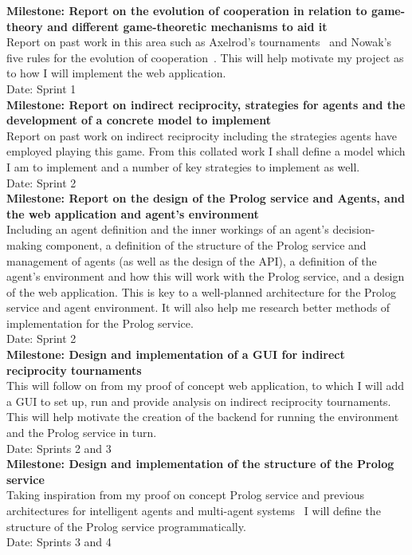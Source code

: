 \documentclass{article}
\begin{document}
\noindent\textbf{Milestone: Report on the evolution of cooperation in relation to game-theory and different game-theoretic mechanisms to aid it}\\
Report on past work in this area such as Axelrod's tournaments~\cite{evolution_of_cooperation} and Nowak's five rules for the evolution of cooperation~\cite{five_rules_coop}. This will help motivate my project as to how I will implement the web application.\\
Date: Sprint 1\\

\noindent\textbf{Milestone: Report on indirect reciprocity, strategies for agents and the development of a concrete model to implement}\\
Report on past work on indirect reciprocity including the strategies agents have employed playing this game. From this collated work I shall define a model which I am to implement and a number of key strategies to implement as well.\\
Date: Sprint 2\\

\noindent\textbf{Milestone: Report on the design of the Prolog service and Agents, and the web application and agent's environment}\\
Including an agent definition and the inner workings of an agent's decision-making component, a definition of the structure of the Prolog service and management of agents (as well as the design of the API), a definition of the agent's environment and how this will work with the Prolog service, and a design of the web application. This is key to a well-planned architecture for the Prolog service and agent environment. It will also help me research better methods of implementation for the Prolog service.\\
Date: Sprint 2\\

\noindent\textbf{Milestone: Design and implementation of a GUI for indirect reciprocity tournaments}\\
This will follow on from my proof of concept web application, to which I will add a GUI to set up, run and provide analysis on indirect reciprocity tournaments. This will help motivate the creation of the backend for running the environment and the Prolog service in turn.\\
Date: Sprints 2 and 3\\

\noindent\textbf{Milestone: Design and implementation of the structure of the Prolog service}\\
Taking inspiration from my proof on concept Prolog service and previous architectures for intelligent agents and multi-agent systems~\cite{prosocs} I will define the structure of the Prolog service programmatically.\\
Date: Sprints 3 and 4\\
\end{document}
